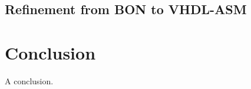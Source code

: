 \documentclass{article}
\begin{document}
\subsection{Refinement from BON to VHDL-ASM}

\section{Conclusion}

A conclusion.




\end{document}
